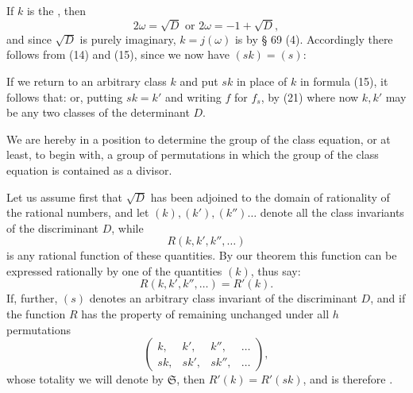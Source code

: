 
If $k$ is the , then
\[
2\omega = \sqrt{D} \text{ or } 2\omega = -1+\sqrt{D},
\]
and since $\sqrt{D}$ is purely imaginary, $k=j(\omega)$ is  by § 69 (4). %
Accordingly there follows from (14) and (15), since we now have $(sk)=(s)$:


If we return to an arbitrary class $k$ and put $sk$ in place of $k$ in formula (15), it follows that:
or, putting $sk=k'$ and writing $f$ for $f_s$, by (21) %
where now $k, k'$ may be any two classes of the determinant $D$.

We are hereby in a position to determine the  group of the class equation, or at least, to begin with, a group of permutations in which the group of the class equation is contained as a divisor.

Let us assume first that $\sqrt{D}$ has been adjoined to the domain of rationality of the rational numbers, and let $(k), (k'), (k'')\ldots$ denote all the class invariants of the discriminant $D$, while
\[
R(k, k', k'', \ldots)
\]
is any rational function of these quantities. By our theorem this function can be expressed rationally by one of the quantities $(k)$, thus say:
\[
R(k, k', k'', \ldots) = R'(k).
\]
If, further, $(s)$ denotes an arbitrary class invariant of the discriminant $D$, and if the function $R$ has the property of remaining unchanged under all $h$ permutations
\[
\begin{pmatrix} k, & k', & k'', & \ldots \\ sk, & sk', & sk'', & \ldots \end{pmatrix},
\]
whose totality we will denote by $\mathfrak{S}$, then $R'(k)=R'(sk)$, and is therefore .


